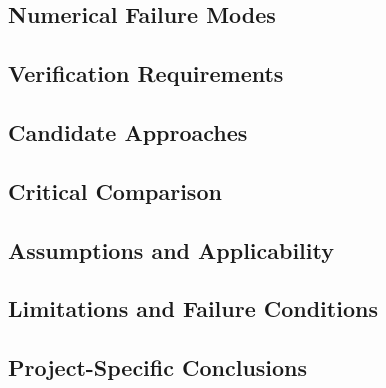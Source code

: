 
\subsection{Numerical Failure Modes}
\label{sec:res-num-flx-numerical-failure-modes}


\subsection{Verification Requirements}
\label{sec:res-num-flx-verification-requirements}


\subsection{Candidate Approaches}
\label{sec:res-num-flx-candidate-approaches}


\subsection{Critical Comparison}
\label{sec:res-num-flx-critical-comparison}


\subsection{Assumptions and Applicability}
\label{sec:res-num-flx-assumptions}


\subsection{Limitations and Failure Conditions}
\label{sec:res-num-flx-limitations}


\subsection{Project-Specific Conclusions}
\label{sec:res-num-flx-conclusions}

